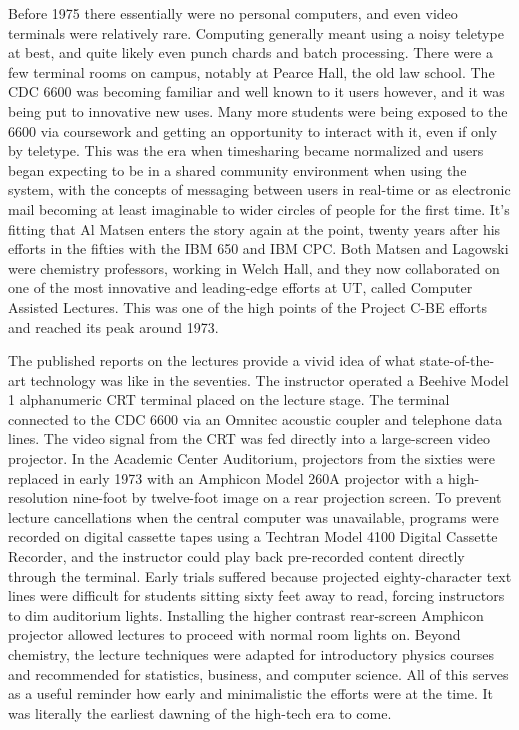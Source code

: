 Before 1975 there essentially were no personal computers, and even video terminals were relatively rare. Computing generally meant using a noisy teletype at best, and quite likely even punch chards and batch processing. There were a few terminal rooms on campus, notably at Pearce Hall, the old law school. The CDC 6600 was becoming familiar and well known to it users however, and it was being put to innovative new uses. Many more students were being exposed to the 6600 via coursework and getting an opportunity to interact with it, even if only by teletype. This was the era when timesharing became normalized and users began expecting to be in a shared community environment when using the system, with the concepts of messaging between users in real-time or as electronic mail becoming at least imaginable to wider circles of people for the first time. It's fitting that Al Matsen enters the story again at the point, twenty years after his efforts in the fifties with the IBM 650 and IBM CPC. Both Matsen and Lagowski were chemistry professors, working in Welch Hall, and they now collaborated on one of the most innovative and leading-edge efforts at UT, called Computer Assisted Lectures. This was one of the high points of the Project C-BE efforts and reached its peak around 1973. \cite{matsenComputerAugmentedLectures1973}

The published reports on the lectures provide a vivid idea of what state-of-the-art technology was like in the seventies. The instructor operated a Beehive Model 1 alphanumeric CRT terminal placed on the lecture stage. The terminal connected to the CDC 6600 via an Omnitec acoustic coupler and telephone data lines. The video signal from the CRT was fed directly into a large-screen video projector. In the Academic Center Auditorium, projectors from the sixties were replaced in early 1973 with an Amphicon Model 260A projector with a high-resolution nine-foot by twelve-foot image on a rear projection screen. To prevent lecture cancellations when the central computer was unavailable, programs were recorded on digital cassette tapes using a Techtran Model 4100 Digital Cassette Recorder, and the instructor could play back pre-recorded content directly through the terminal. Early trials suffered because projected eighty-character text lines were difficult for students sitting sixty feet away to read, forcing instructors to dim auditorium lights. Installing the higher contrast rear-screen Amphicon projector allowed lectures to proceed with normal room lights on. Beyond chemistry, the lecture techniques were adapted for introductory physics courses and recommended for statistics, business, and computer science. All of this serves as a useful reminder how early and minimalistic the efforts were at the time. It was literally the earliest dawning of the high-tech era to come. 

